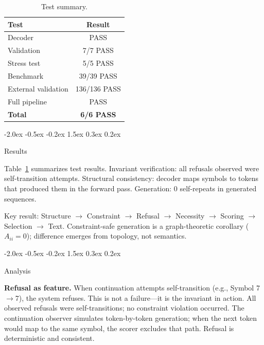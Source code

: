 \documentclass[10pt]{article}
\makeatletter
\renewcommand{\section}{\@startsection{section}{1}{\z@}%
  {-2.0ex \@plus -0.5ex \@minus -0.2ex}%
  {1.5ex \@plus 0.3ex \@minus 0.2ex}%
  {\large\bfseries\raggedright}}
\makeatother
\begin{document}
\begin{table}[t]
\centering
\caption{Test summary.}
\label{tab:summary}
\begin{tabular}{lc}
\toprule
\textbf{Test} & \textbf{Result} \\
\midrule
Decoder & PASS \\
Validation & 7/7 PASS \\
Stress test & 5/5 PASS \\
Benchmark & 39/39 PASS \\
External validation & 136/136 PASS \\
Full pipeline & PASS \\
\midrule
\textbf{Total} & \textbf{6/6 PASS} \\
\bottomrule
\end{tabular}
\end{table}

\section{Results}
\label{sec:results}

Table~\ref{tab:summary} summarizes test results. Invariant verification: all refusals observed were self-transition attempts. Structural consistency: decoder maps symbols to tokens that produced them in the forward pass. Generation: 0 self-repeats in generated sequences.

Key result: Structure $\rightarrow$ Constraint $\rightarrow$ Refusal $\rightarrow$ Necessity $\rightarrow$ Scoring $\rightarrow$ Selection $\rightarrow$ Text. Constraint-safe generation is a graph-theoretic corollary ($A_{ii} = 0$); difference emerges from topology, not semantics.

\section{Analysis}
\label{sec:analysis}

\textbf{Refusal as feature.}
When continuation attempts self-transition (e.g., Symbol 7$\rightarrow$7), the system refuses. This is not a failure---it is the invariant in action. All observed refusals were self-transitions; no constraint violation occurred. The continuation observer simulates token-by-token generation; when the next token would map to the same symbol, the scorer excludes that path. Refusal is deterministic and consistent.
\end{document}
